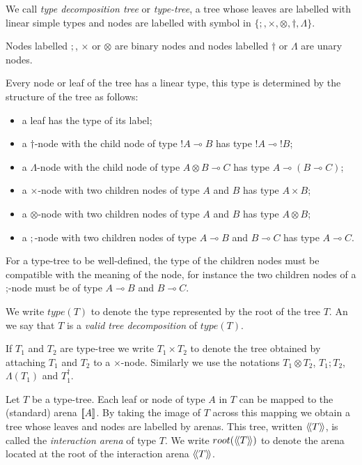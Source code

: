 \begin{dfn}
We call \emph{type decomposition tree} or \emph{type-tree}, a tree whose leaves are labelled with linear simple types
and nodes are labelled with symbol in $\{ ;, \times, \otimes, \dagger, \Lambda \}$.

Nodes labelled $;$, $\times$ or $\otimes$ are binary nodes and nodes labelled $\dagger$ or $\Lambda$ are unary nodes.

Every node or leaf of the tree has a linear type, this type is determined by the
structure of the tree as follows:
\begin{itemize}
\item a leaf has the type of its label;

\item a $\dagger$-node with the child node of type $!A \multimap B$ has type $!A \multimap !B$;

\item a $\Lambda$-node with the child node of type $A \otimes B \multimap C$ has type $A \multimap (B \multimap C)$;

\item a $\times$-node with two children nodes of type $A$
and $B$ has type $A \times B$;

\item a $\otimes$-node with two children nodes of type $A$
and $B$ has type $A\otimes B$;

\item a $;$-node with two children nodes of type $A\multimap B$
and $B \multimap C$ has type $A \multimap C$.
\end{itemize}

For a type-tree to be well-defined, the type of the children nodes
must be compatible with the meaning of the node, for instance the
two children nodes of a ;-node must be of type
$A\multimap B$ and $B\multimap C$.

We write $type(T)$ to denote the type represented by the root of the tree $T$. An we say that $T$ is a \emph{valid
tree decomposition} of $type(T)$.

If $T_1$ and $T_2$ are type-tree we write $T_1 \times T_2$ to denote the tree obtained by attaching $T_1$ and $T_2$ to a $\times$-node.
Similarly we use the notations $T_1 \otimes T_2$, $T_1 ; T_2$, $\Lambda(T_1)$ and  $T_1^\dagger$.
\end{dfn}


Let $T$ be a type-tree. Each leaf or node of type $A$ in $T$ can be mapped to the
(standard) arena ${[\![ A ]\!]}$. By taking the image of $T$ across this mapping we obtain a tree whose leaves and nodes are labelled by arenas.
This tree, written ${\langle\!\langle T \rangle\!\rangle}$, is called the \emph{interaction arena} of type $T$.
We write $root({\langle\!\langle T \rangle\!\rangle})$ to denote the arena located at the root of the interaction arena ${\langle\!\langle T \rangle\!\rangle}$.

